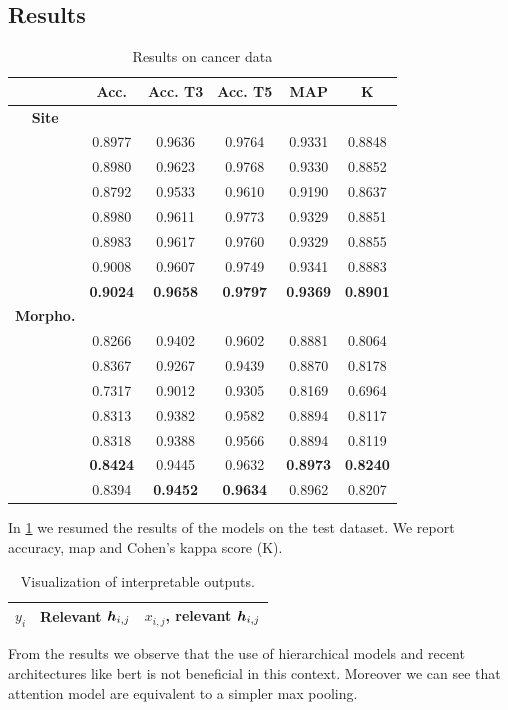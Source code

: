 \subsection{Results}

\begin{table}
  \centering
  \caption{Results on cancer data}
  \label{tab:results}
  \begin{tabular}{|c|c|c|c|c|c|}
    \hline
    &Acc.&Acc. T3&Acc. T5&MAP&K\\
    \hline
    \hline
    \textbf{Site}&&&&&\\
    \gru{}&0.8977&0.9636&0.9764&0.9331&0.8848\\
    \bert{}&0.8980&0.9623&0.9768&0.9330&0.8852\\
    \maxi{}&0.8792&0.9533&0.9610&0.9190&0.8637\\
    \maxh{}&0.8980&0.9611&0.9773&0.9329&0.8851\\
    \softmaxh{}&0.8983&0.9617&0.9760&0.9329&0.8855\\
    \softmax{}&0.9008&0.9607&0.9749&0.9341&0.8883\\
    \maxp{}&\textbf{0.9024}&\textbf{0.9658}&\textbf{0.9797}&\textbf{0.9369}&\textbf{0.8901}\\
    \hline
    \hline
    \textbf{Morpho.}&&&&&\\
    \gru{}&0.8266&0.9402&0.9602&0.8881&0.8064\\
    \bert{}&0.8367&0.9267&0.9439&0.8870&0.8178\\
    \maxi{}&0.7317&0.9012&0.9305&0.8169&0.6964\\
    \maxh{}&0.8313&0.9382&0.9582&0.8894&0.8117\\
    \softmaxh{}&0.8318&0.9388&0.9566&0.8894&0.8119\\
    \softmax{}&\textbf{0.8424}&0.9445&0.9632&\textbf{0.8973}&\textbf{0.8240}\\
    \maxp{}&0.8394&\textbf{0.9452}&\textbf{0.9634}&0.8962&0.8207\\
    \hline
  \end{tabular}
\end{table}
In \cref{tab:results} we resumed the results of the models on the test
dataset. We report accuracy, \ac{map} and Cohen's kappa score (K).

\begin{table}
  \centering
  \ttfamily
  \scriptsize
  \caption{Visualization of interpretable outputs.}
  \label{tab:multiAttention1}
  \begin{tabular}{|c|c|c|}
    \hline
    $y_i$&\textrm{Relevant} $\bm{h}_{i,j}$&$x_{i,j}$\textrm{, relevant} $\bm{h}_{i,j}$\\
    \hline
    
    \hline
    
    \hline
    
    \hline
  \end{tabular}
\end{table}
From the results we observe that the use of hierarchical models and
recent architectures like \ac{bert} is not beneficial in this
context. Moreover we can see that attention model are equivalent to a
simpler max pooling.

